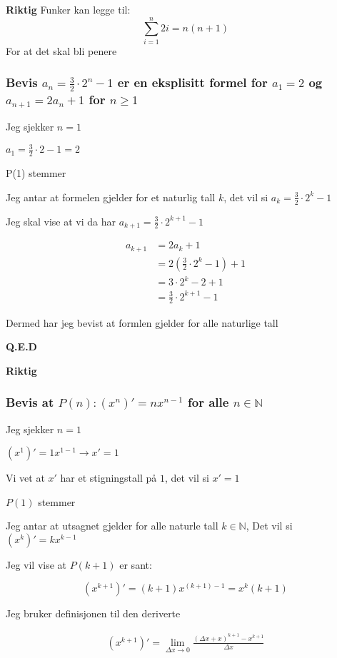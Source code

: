 \documentclass{article}
\begin{document}
\textbf{Riktig}
Funker kan legge til:
\[
\sum_{i=1}^{n} 2i = n(n + 1)
\]
For at det skal bli penere

\subsubsection{Bevis $a_n=\frac{3}{2} \cdot 2^n -1$ er en eksplisitt formel for $a_1=2$ og $a_{n+1}=2a_n+1$ for $n \ge 1$}

Jeg sjekker $n=1$

$a_1=\frac{3}{2} \cdot 2 - 1 = 2$

P(1) stemmer

Jeg antar at formelen gjelder for et naturlig tall $k$, det vil si  $a_k=\frac{3}{2} \cdot 2^k - 1$

Jeg skal vise at vi da har $a_{k+1} = \frac{3}{2} \cdot 2^{k+1} - 1$

\begin{align*}
    a_{k+1} &= 2a_k+1 \\
    &= 2(\frac{3}{2} \cdot 2^{k} - 1) + 1 \\
    &= 3 \cdot 2^k - 2 + 1 \\
    &= \frac{3}{2} \cdot 2^{k+1} - 1
\end{align*}

Dermed har jeg bevist at formlen gjelder for alle naturlige tall

\textbf{Q.E.D}

\textbf{Riktig}

\subsubsection{Bevis at $P(n): (x^n)'= nx^{n-1}$ for alle $n \in \mathbb{N}$}

Jeg sjekker $n=1$

$(x^1)'= 1x^{1-1} \rightarrow x'=1$

Vi vet at $x'$ har et stigningstall på $1$, det vil si $x'= 1$

$P(1)$ stemmer

Jeg antar at utsagnet gjelder for alle naturle tall $k \in \mathbb{N}$, Det vil si $(x^k)' = kx^{k-1}$

Jeg vil vise at $P(k+1)$ er sant:

$$(x^{k+1})' = (k+1)x^{(k+1)-1} = x^k(k+1)$$

Jeg bruker definisjonen til den deriverte

\begin{align*}
    (x^{k+1})'=\lim_{\Delta x \rightarrow 0}\frac{(\Delta x + x)^{k+1}-x^{k+1}}{\Delta x}
\end{align*}
\end{document}
